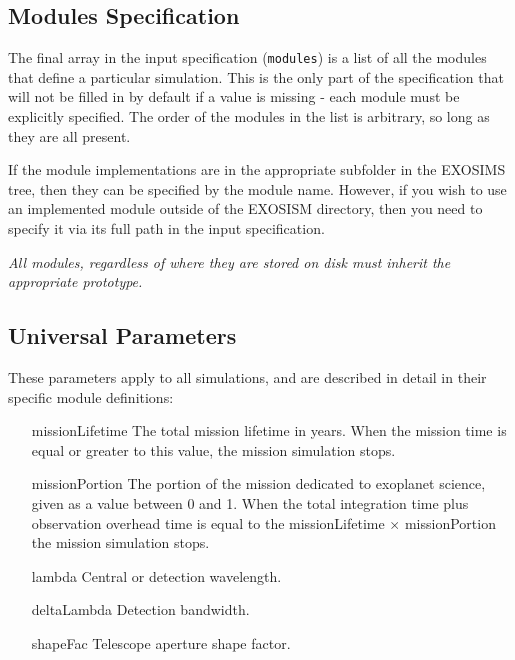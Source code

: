 \documentclass[cleanfoot]{asme2ej}
\begin{document}
\subsection{Modules Specification}
The final array in the input specification  (\verb+modules+) is a list of all the modules that define a particular simulation.  This is the only part of the specification that will not be filled in by default if a value is missing - each module must be explicitly specified. The order of the modules in the list is arbitrary, so long as they are all present. 

If the module implementations are in the appropriate subfolder in the EXOSIMS tree, then they can be specified by the module name.  However, if you wish to use an implemented module outside of the EXOSISM directory, then you need to specify it via its full path in the input specification.

\emph{All modules, regardless of where they are stored on disk must inherit the appropriate prototype.}

\subsection{Universal Parameters}
These parameters apply to all simulations, and are described in detail in their specific module definitions:

\begin{itemize}[leftmargin=1in,font={\ttfamily}]
\item[missionLifetime]  The total mission lifetime in years.  When the mission time is equal or greater to this value, the mission simulation stops.
\item[missionPortion]  The portion of the mission dedicated to exoplanet science, given as a value between 0 and 1.  When the total integration time plus observation overhead time is equal to the missionLifetime $\times$ missionPortion the mission simulation stops.
\item[lambda]  Central or detection wavelength.
\item[deltaLambda]  Detection bandwidth.
\item[shapeFac]  Telescope aperture shape factor.
\end{itemize}

\end{document}
